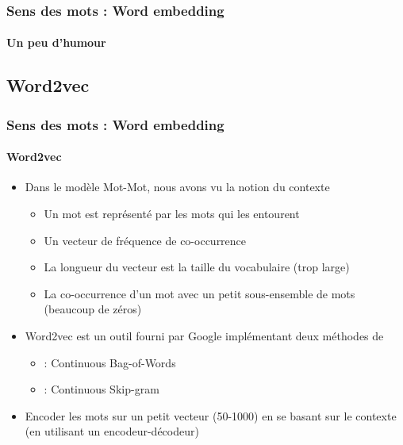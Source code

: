 \documentclass[xcolor=table]{beamer}
\begin{document}
\begin{frame}
\frametitle{Sens des mots : Word embedding}
\framesubtitle{Un peu d'humour}
\begin{center}
\end{center}
\end{frame}


\subsection{Word2vec}

\begin{frame}
\frametitle{Sens des mots : Word embedding}
\framesubtitle{Word2vec}

\begin{itemize}
	\item Dans le modèle Mot-Mot, nous avons vu la notion du contexte 
	\begin{itemize}
		\item Un mot est représenté par les mots qui les entourent
		\item Un vecteur de fréquence de co-occurrence
		\item La longueur du vecteur est la taille du vocabulaire (trop large)
		\item La co-occurrence d'un mot avec un petit sous-ensemble de mots (beaucoup de zéros)
	\end{itemize}
	\item Word2vec est un outil fourni par Google implémentant deux méthodes de  \cite{2013-mikolov-al}
	\begin{itemize}
		\item {} : Continuous Bag-of-Words
		\item {} : Continuous Skip-gram
	\end{itemize}
	\item Encoder les mots sur un petit vecteur (50-1000) en se basant sur le contexte (en utilisant un encodeur-décodeur)
\end{itemize}

\end{frame}
\end{document}

